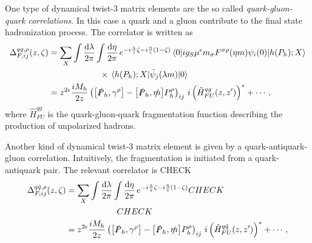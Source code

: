 One type of dynamical twist-3 matrix elements are the so called \textit{quark-gluon-quark correlations}. In this case a quark and a gluon contribute to the final state hadronization process. The correlator is written as
\begin{equation}
    \begin{aligned}
        \Delta^{qg,\rho}_{F,ij}(z,\zeta)&= \sum_X\int\frac{\dd \lambda}{2\pi}\int\frac{\dd \eta}{2\pi} \,e^{-i\frac{\lambda }{z}\zeta-i\frac{\eta}{z}\left(1-\zeta\right)}\mel{0}{ig_S \mu^\epsilon m_\sigma F^{\sigma \rho}(\eta m)\psi_i(0)}{h(P_h);X}\\
        &\qquad \qquad \qquad \times\mel{h(P_h);X}{\bar \psi_j(\lambda m)}{0}\\
        &= z^{2\epsilon}\frac{iM_h}{2z}\left(\comm{\slashed{P}_h}{\gamma^\rho}-\comm{\slashed{P}_h}{\slashed{m}}P_h^\rho\right)_{ij}\,i\left(\hat H^{qg}_{FU}(z,z')\right)^*+\cdots,
        \end{aligned}
\end{equation}
where $\hat{H}_{FU}^{qg}$ is the quark-gluon-quark fragmentation function describing the production of unpolarized hadrons. 

Another kind of dynamical twist-3 matrix element is given by a quark-antiquark-gluon correlation. Intuitively, the fragmentation is initiated from a quark-antiquark pair. The relevant correlator is CHECK
\begin{equation}
    \begin{aligned}
        \Delta^{q \bar{q},\rho}_{F,ij}(z,\zeta)&= \sum_X\int\frac{\dd \lambda}{2\pi}\int\frac{\dd \eta}{2\pi} \,e^{-i\frac{\lambda }{z}\zeta-i\frac{\eta}{z}\left(1-\zeta\right)}CHECK\\
        &\qquad \qquad \qquad CHECK\\
        &= z^{2\epsilon}\frac{iM_h}{2z}\left(\comm{\slashed{P}_h}{\gamma^\rho}-\comm{\slashed{P}_h}{\slashed{m}}P_h^\rho\right)_{ij}\,i\left(\hat H^{q\bar{q}}_{FU}(z,z')\right)^*+\cdots,
        \end{aligned}
\end{equation}

